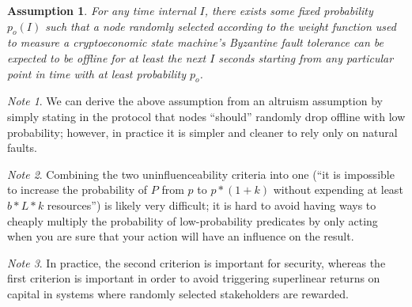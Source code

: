 \documentclass[11pt,a4paper]{report}
\theoremstyle{plain}
\newtheorem{assm}{Assumption}[chapter]
\theoremstyle{definition}
\theoremstyle{remark}
\newtheorem*{note}{Note}
\begin{document}
\begin{assm}
For any time internal $I$, there exists some fixed probability $p_o(I)$ such that a node randomly selected according to the weight function used to measure a cryptoeconomic state machine's Byzantine fault tolerance can be expected to be offline for at least the next $I$ seconds starting from any particular point in time with at least probability $p_o$.
\end{assm}

\begin{note}
We can derive the above assumption from an altruism assumption by simply stating in the protocol that nodes ``should'' randomly drop offline with low probability; however, in practice it is simpler and cleaner to rely only on natural faults.
\end{note}

\begin{note}
Combining the two uninfluenceability criteria into one (``it is impossible to increase the probability of $P$ from $p$ to $p * (1 + k)$ without expending at least $b * L * k$ resources'') is likely very difficult; it is hard to avoid having ways to cheaply multiply the probability of low-probability predicates by only acting when you are sure that your action will have an influence on the result. 
\end{note}

\begin{note}
In practice, the second criterion is important for security, whereas the first criterion is important in order to avoid triggering superlinear returns on capital in systems where randomly selected stakeholders are rewarded.
\end{note}
\end{document}
